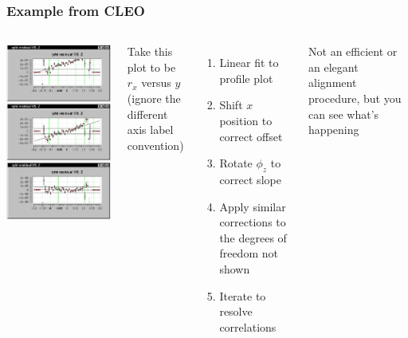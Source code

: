 \documentclass[12pt,compress]{beamer}
\begin{document}
\begin{frame}
\frametitle{Example from CLEO}

\begin{columns}
\includegraphics[width=\linewidth]{hand_alignment3}

Take this plot to be $r_x$ versus $y$ \\
(ignore the different axis label convention)

\begin{enumerate}
  \item Linear fit to profile plot
  \item Shift $x$ position to correct offset
  \item Rotate $\phi_z$ to correct slope
  \item Apply similar corrections to the degrees of freedom not shown
  \item Iterate to resolve correlations
\end{enumerate}

Not an efficient or an elegant alignment procedure, but you can see what's happening
\end{columns}
\end{frame}
\end{document}
